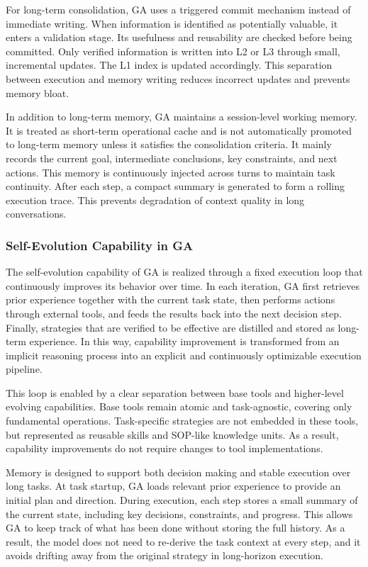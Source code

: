 For long-term consolidation, GA uses a triggered commit mechanism instead of immediate writing.
When information is identified as potentially valuable, it enters a validation stage.
Its usefulness and reusability are checked before being committed.
Only verified information is written into L2 or L3 through small, incremental updates.
The L1 index is updated accordingly. This separation between execution and memory writing reduces incorrect updates and prevents memory bloat.

In addition to long-term memory, GA maintains a session-level working memory.
It is treated as short-term operational cache and is not automatically promoted to long-term memory unless it satisfies the consolidation criteria.
It mainly records the current goal, intermediate conclusions, key constraints, and next actions.
This memory is continuously injected across turns to maintain task continuity.
After each step, a compact summary is generated to form a rolling execution trace.
This prevents degradation of context quality in long conversations.


\subsubsection{Self-Evolution Capability in GA}
\label{sec:self-evolution}
The self-evolution capability of GA is realized through a fixed execution loop that continuously improves its behavior over time. In each iteration, GA first retrieves prior experience together with the current task state, then performs actions through external tools, and feeds the results back into the next decision step. Finally, strategies that are verified to be effective are distilled and stored as long-term experience. In this way, capability improvement is transformed from an implicit reasoning process into an explicit and continuously optimizable execution pipeline.

This loop is enabled by a clear separation between base tools and higher-level evolving capabilities. 
Base tools remain atomic and task-agnostic, covering only fundamental operations. 
Task-specific strategies are not embedded in these tools, but represented as reusable skills and SOP-like knowledge units.
As a result, capability improvements do not require changes to tool implementations. 

Memory is designed to support both decision making and stable execution over long tasks. 
At task startup, GA loads relevant prior experience to provide an initial plan and direction. 
During execution, each step stores a small summary of the current state, including key decisions, constraints, and progress. 
This allows GA to keep track of what has been done without storing the full history. 
As a result, the model does not need to re-derive the task context at every step, and it avoids drifting away from the original strategy in long-horizon execution.

